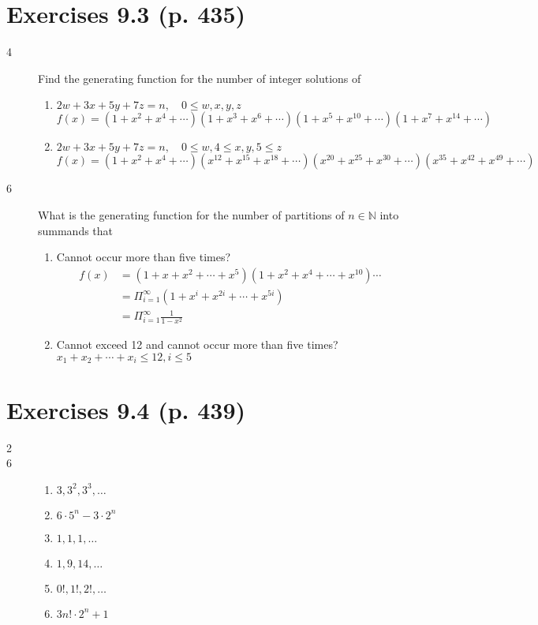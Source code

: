 \documentclass[a4paper]{article}
\begin{document}
\section*{Exercises 9.3 (p. 435)  }
\begin{description}
\item[4] Find the generating function for the number of integer solutions of
\begin{enumerate}[label=\alph*)]
    \item $2w+3x+5y+7z=n,\quad 0\leq w,x,y,z$\\
    $f(x)=(1+x^2+x^4+\cdots)(1+x^3+x^6+\cdots)(1+x^5+x^{10}+\cdots)(1+x^7+x^{14}+\cdots)$
    \item $2w+3x+5y+7z=n,\quad 0\leq w, 4\leq x,y, 5\leq z$\\
    $f(x)=(1+x^2+x^4+\cdots)(x^{12}+x^{15}+x^{18}+\cdots)(x^{20}+x^{25}+x^{30}+\cdots)(x^{35}+x^{42}+x^{49}+\cdots)$
\end{enumerate}
\item[6] What is the generating function for the number of partitions of $n\in\mathbb{N}$ into summands that
\begin{enumerate}[label=(\alph*)]
    \item Cannot occur more than five times?
    \begin{align*}
    f(x)&=(1+x+x^2+\cdots +x^5)(1+x^2+x^4+\cdots +x^{10})\cdots\\
    &=\Pi_{i=1}^{\infty}{(1+x^i+x^{2i}+\cdots+x^{5i})}\\
    &=\Pi_{i=1}^{\infty}{\frac{1}{1-x^2}}
    \end{align*}
    \item Cannot exceed 12 and cannot occur more than five times?
    $x_1+x_2+\cdots+x_i\leq 12,i\leq 5$
\end{enumerate}
\end{description}

\section*{Exercises 9.4 (p. 439)  }
\begin{description}
\item[2]
\item[6]
\begin{enumerate}[label=(\alph*)]
    \item $3,3^2,3^3,\ldots$
    \item $6\cdot 5^n - 3\cdot 2^n$
    \item $1, 1, 1,\ldots$
    \item $1,9,14,\ldots$
    \item $0!, 1!, 2!, \ldots$
    \item $3n!\cdot 2^n + 1$
\end{enumerate}
\end{description}
\end{document}
